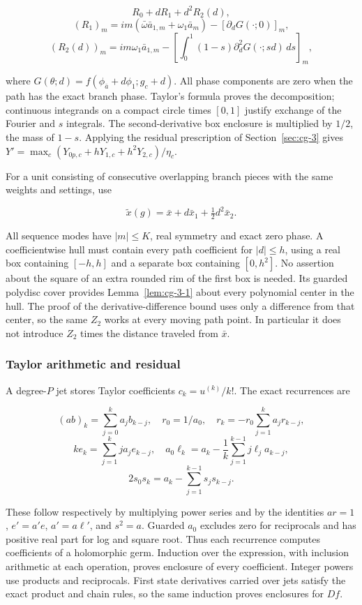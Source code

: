 \documentclass[11pt]{article}
\theoremstyle{definition}
\begin{document}
\[
 R_0+dR_1+d^2R_2(d),
\]
\[
 (R_1)_m=im(\bar\omega\bar a_{1,m}+\omega_1\bar a_m)-[\partial_dG(\cdot;0)]_m,
\]
\[
 (R_2(d))_m=im\omega_1\bar a_{1,m}
 -\left[\int_0^1(1-s)\partial_d^2G(\cdot;sd)\,ds\right]_m,
\]

where $G(\theta;d)=f(\phi_{\bar a}+d\phi_1;g_c+d)$. All phase components are zero when the path has the exact branch phase. Taylor's formula proves the decomposition; continuous integrands on a compact circle times $[0,1]$ justify exchange of the Fourier and $s$ integrals. The second-derivative box enclosure is multiplied by $1/2$, the mass of $1-s$. Applying the residual prescription of Section~\ref{sec:cg-3} gives $Y'=\max_c(Y_{0p,c}+hY_{1,c}+h^2Y_{2,c})/\eta_c$.

For a unit consisting of consecutive overlapping branch pieces with the same weights and settings, use

\[
 \widetilde x(g)=\bar x+d\bar x_1+\tfrac12d^2\bar x_2.
\]

All sequence modes have $|m|\le K$, real symmetry and exact zero phase. A coefficientwise hull must contain every path coefficient for $|d|\le h$, using a real box containing $[-h,h]$ and a separate box containing $[0,h^2]$. No assertion about the square of an extra rounded rim of the first box is needed. Its guarded polydisc cover provides Lemma~\ref{lem:cg-3-1} about every polynomial center in the hull. The proof of the derivative-difference bound uses only a difference from that center, so the same $Z_2$ works at every moving path point. In particular it does not introduce $Z_2$ times the distance traveled from $\bar x$.

\subsubsection{Taylor arithmetic and residual}\label{sec:cg-5-1}

A degree-$P$ jet stores Taylor coefficients $c_k=u^{(k)}/k!$. The exact recurrences are

\[
 (ab)_k=\sum_{j=0}^ka_jb_{k-j},\quad
 r_0=1/a_0,\quad r_k=-r_0\sum_{j=1}^ka_jr_{k-j},
\]
\[
 ke_k=\sum_{j=1}^kja_je_{k-j},\quad
 a_0\ell_k=a_k-\frac1k\sum_{j=1}^{k-1}j\ell_ja_{k-j},
\]
\[
 2s_0s_k=a_k-\sum_{j=1}^{k-1}s_js_{k-j}.
\]

These follow respectively by multiplying power series and by the identities $ar=1$, $e'=a'e$, $a'=a\ell'$, and $s^2=a$. Guarded $a_0$ excludes zero for reciprocals and has positive real part for log and square root. Thus each recurrence computes coefficients of a holomorphic germ. Induction over the expression, with inclusion arithmetic at each operation, proves enclosure of every coefficient. Integer powers use products and reciprocals. First state derivatives carried over jets satisfy the exact product and chain rules, so the same induction proves enclosures for $Df$.
\end{document}
